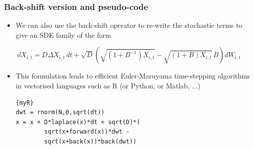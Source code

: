\documentclass[mathserif]{beamer}
\begin{document}
\begin{frame}[fragile]
\frametitle{Back-shift version and pseudo-code}
\begin{itemize}
\item We can also use the back-shift operator to re-write the stochastic terms to give an SDE family of the form
\end{itemize}
\[
dX_{i,t} = D\Delta X_{i,t}\,dt + \sqrt{D}\left(\sqrt{(1+B^{-1})X_{i,t}}-\sqrt{(1+B)X_{i,t}}\,B\right)dW_{i,t}
\]
\begin{itemize}
\item
This formulation leads to efficient Euler-Maruyama time-stepping algorithms in vectorised languages such as R (or Python, or Matlab, ...)
\begin{lstlisting}{myR}
dwt = rnorm(N,0,sqrt(dt))
x = x + D*laplace(x)*dt + sqrt(D)*(
        sqrt(x+forward(x))*dwt - 
        sqrt(x+back(x))*back(dwt))
\end{lstlisting}
\end{itemize}
\end{frame}


\end{document}

